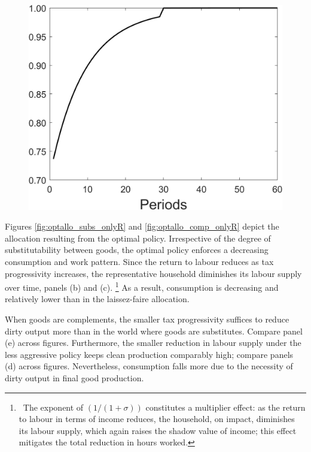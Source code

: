 \begin{figure}[h!!]
\begin{minipage}[]{0.32\textwidth}
\end{minipage}
\begin{minipage}[]{0.32\textwidth}
	\includegraphics[width=1\textwidth]{../../codding_model/Own/figures/Rep_agent/staticRam_LF_separate_tauul_periods59_eppsilon0.40_zeta1.40_Ad08_Ac04_thetac0.70_thetad0.56_HetGrowth1_tauul0.181_util0_withtarget1_lgd0.png}
\end{minipage}
\end{figure}

Figures \ref{fig:optallo_subs_onlyR} and \ref{fig:optallo_comp_onlyR} depict the allocation resulting from the optimal policy.
Irrespective of the degree of substitutability between goods, the optimal policy enforces a decreasing consumption and work pattern.  
Since the return to labour reduces as tax progressivity increases, the representative household diminishes its labour supply over time, panels (b) and (c). \footnote{\ The exponent of $(1/(1+\sigma))$ constitutes a multiplier effect: as the return to labour in terms of income reduces, the household, on impact, diminishes its labour supply, which again raises the shadow value of income; this effect mitigates the total reduction in hours worked.} 
As a result, consumption is  decreasing and relatively lower than in the laissez-faire allocation. 

When goods are complements,  the smaller tax progressivity suffices to reduce dirty output more than in the world where goods are substitutes. Compare panel (e) across figures. Furthermore, the smaller reduction in labour supply under the less aggressive policy keeps clean production comparably high; compare panels (d) across figures. Nevertheless, consumption falls more due to the necessity of dirty output in final good production. 

